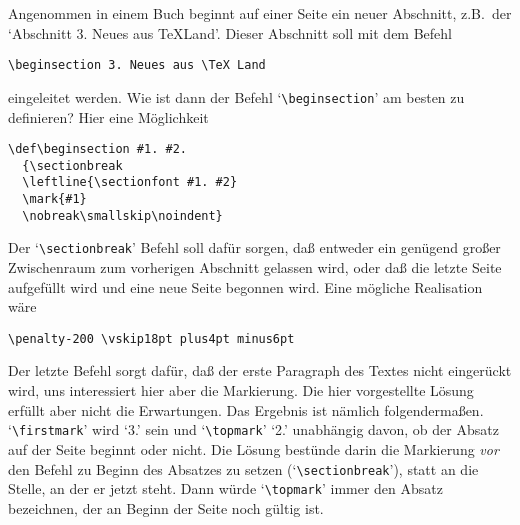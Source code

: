 Angenommen in einem Buch beginnt auf einer Seite ein
neuer Abschnitt,
z.B.\ der `Abschnitt 3. Neues aus \TeX Land'. Dieser Abschnitt soll
mit dem Befehl
\begin{verbatim}
\beginsection 3. Neues aus \TeX Land
\end{verbatim}
eingeleitet werden. Wie ist dann der Befehl `\verb|\beginsection|' am
besten zu definieren? Hier eine M\"oglichkeit
\begin{verbatim}
\def\beginsection #1. #2.
  {\sectionbreak
  \leftline{\sectionfont #1. #2}
  \mark{#1}
  \nobreak\smallskip\noindent}
\end{verbatim}
Der `\verb|\sectionbreak|' Befehl soll daf\"ur sorgen, da\ss{} entweder ein
gen\"ugend gro\ss{}er 
Zwischenraum zum vorherigen Abschnitt gelassen wird,
oder da\ss{} die letzte 
Seite aufgef\"ullt wird und eine neue Seite begonnen
wird. Eine m\"ogliche Realisation w\"are
\begin{verbatim}
\penalty-200 \vskip18pt plus4pt minus6pt
\end{verbatim}
Der letzte Befehl sorgt daf\"ur, da\ss{} der erste Paragraph des Textes
nicht einger\"uckt wird, uns interessiert hier aber die Markierung. Die
hier vorgestellte L\"osung erf\"ullt aber nicht die Erwartungen. Das
Ergebnis ist n\"amlich folgenderma\ss{}en.
`\verb|\firstmark|' wird `3.'
sein und 
`\verb|\topmark|' `2.' unabh\"angig davon, ob der
Absatz auf
der Seite beginnt oder nicht. Die L\"osung best\"unde darin die Markierung
{\em vor} den Befehl zu Beginn des Absatzes zu setzen
(`\verb|\sectionbreak|'), statt an die Stelle, an der er jetzt steht.
Dann w\"urde `\verb|\topmark|' immer den Absatz bezeichnen, der an
Beginn der Seite noch g\"ultig ist.

